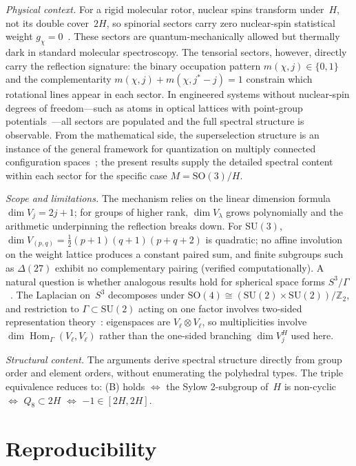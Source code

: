 \documentclass[12pt]{article}
\theoremstyle{definition}
\theoremstyle{remark}
\newcommand{\ZZ}{\mathbb{Z}}
\newcommand{\SU}{\mathrm{SU}}
\newcommand{\SO}{\mathrm{SO}}
\DeclareMathOperator{\Hom}{Hom}
\begin{document}
\emph{Physical context.}
For a rigid molecular rotor, nuclear spins transform
under~$H$, not its double cover~$2H$, so spinorial
sectors carry zero nuclear-spin statistical weight
$g_\chi = 0$~\cite{BunkerJensen2006}.
These sectors are quantum-mechanically allowed but
thermally dark in standard molecular spectroscopy.
The tensorial sectors, however, directly carry the
reflection signature: the binary occupation pattern
$m(\chi,j) \in \{0,1\}$ and the complementarity
$m(\chi,j) + m(\chi,j^*{-}j) = 1$ constrain which
rotational lines appear in each sector.
In engineered systems without nuclear-spin degrees of
freedom---such as atoms in optical lattices with
point-group potentials~\cite{Koch2019}---all sectors
are populated and the full spectral structure is
observable.
From the mathematical side, the superselection
structure is an instance of the general framework
for quantization on multiply connected configuration
spaces~\cite{Landsman2016}; the present results
supply the detailed spectral content within each
sector for the specific case $M = \SO(3)/H$.

\emph{Scope and limitations.}
The mechanism relies on the linear dimension formula
$\dim V_j = 2j{+}1$; for groups of higher rank,
$\dim V_\lambda$ grows polynomially and the arithmetic
underpinning the reflection breaks down.
For $\SU(3)$, $\dim V_{(p,q)} = \tfrac{1}{2}(p{+}1)(q{+}1)(p{+}q{+}2)$
is quadratic; no affine involution on the weight lattice
produces a constant paired sum, and finite subgroups such as
$\Delta(27)$ exhibit no complementary pairing
(verified computationally).
A natural question is whether analogous results hold for
spherical space forms $S^3/\Gamma$~\cite{Wolf2011}.
The Laplacian on~$S^3$ decomposes under
$\SO(4) \cong (\SU(2) \times \SU(2))/\ZZ_2$, and
restriction to $\Gamma \subset \SU(2)$ acting on one factor
involves two-sided representation theory~\cite{Ikeda1980}:
eigenspaces are $V_\ell \otimes V_\ell$, so multiplicities
involve $\dim\Hom_\Gamma(V_\ell, V_\ell)$ rather than the
one-sided branching $\dim V_j^H$ used here.

\emph{Structural content.}
The arguments derive spectral structure directly from
group order and element orders, without enumerating
the polyhedral types.
The triple equivalence reduces to:
(B) holds $\Leftrightarrow$ the Sylow 2-subgroup
of~$H$ is non-cyclic $\Leftrightarrow$
$Q_8 \subset 2H$ $\Leftrightarrow$
$-1 \in [2H, 2H]$.

\section*{Reproducibility}
\end{document}
